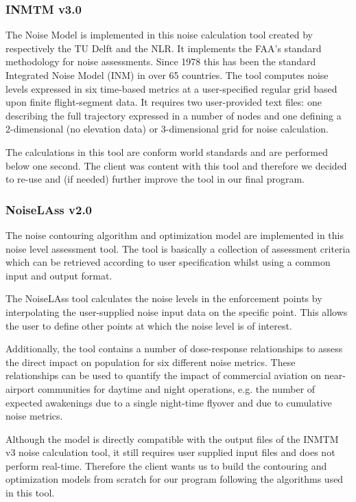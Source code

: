 \subsubsection{INMTM v3.0} The Noise Model is implemented in this noise calculation tool created by respectively the TU Delft and the NLR. It implements the FAA’s standard methodology for noise assessments. Since 1978 this has been the standard Integrated Noise Model (INM) in over 65 countries. The tool computes noise levels expressed in six time-based metrics at a user-specified regular grid based upon finite flight-segment data. It requires two user-provided text files: one describing the full trajectory expressed in a number of nodes and one defining a 2-dimensional (no elevation data) or 3-dimensional grid for noise calculation.

The calculations in this tool are conform world standards and are performed below one second. The client was content with this tool and therefore we decided to re-use and (if needed) further improve the tool in our final program. 

\subsubsection{NoiseLAss v2.0} The noise contouring algorithm and optimization model are implemented in this noise level assessment tool. The tool is basically a collection of assessment criteria which can be retrieved according to user specification whilst using a common input and output format. 

The NoiseLAss tool calculates the noise levels in the enforcement points by interpolating the user-supplied noise input data on the specific point. This allows the user to define other points at which the noise level is of interest. 

Additionally, the tool contains a number of dose-response relationships to assess the direct impact on population for six different noise metrics. These relationships can be used to quantify the impact of commercial aviation on near-airport communities for daytime and night operations, e.g. the number of expected awakenings due to a single night-time flyover and due to cumulative noise metrics. 

Although the model is directly compatible with the output files of the INMTM v3 noise calculation tool, it still requires user supplied input files and does not perform real-time. Therefore the client wants us to build the contouring and optimization models from scratch for our program following the algorithms used in this tool.

